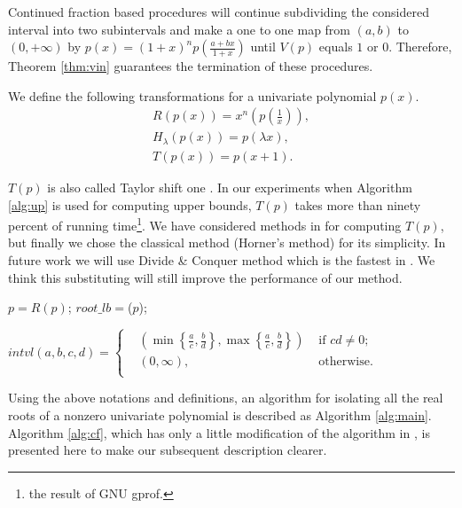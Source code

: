   Continued fraction based procedures will continue subdividing the considered interval into two subintervals and make a one to one map from $(a,b)$ to $(0,+\infty)$ by $  p(x) = (1+x)^{n}p(\frac{a+bx}{1+x})$ until $V(p)$ equals $1$ or $0$. Therefore, Theorem \ref{thm:vin} guarantees the termination of these  procedures.

\begin{definition}  We define the following transformations for a univariate polynomial $p(x)$.
  \begin{eqnarray*}
  R(p(x))=x^n(p(\frac{1}{x})),\\
  H_\lambda(p(x))=p(\lambda x),\\
  T(p(x))=p(x+1).
  \end{eqnarray*}
\end{definition}

$T(p)$  is also called	Taylor shift one \cite{ger04,joh05}. In our experiments when Algorithm \ref{alg:up} is used for computing upper bounds, $T(p)$  takes  more than
ninety percent of running time\footnote{the result of  GNU gprof.}.  We have considered methods in \cite{ger04} for computing $T(p)$, but   finally we chose the  classical
method (Horner's method) for its simplicity. In future work we will use Divide \& Conquer method which is the fastest in \cite{ger04}. We think this substituting
will still improve the performance of our method.

\begin{algorithm}
\caption{\dec}
\DontPrintSemicolon
{}
\end{algorithm}

\begin{algorithm}\label{alg:lb}
\caption{\lb \label{alg:dec}}
\DontPrintSemicolon
{}
$p=R(p)$;\;
$root\_lb=$\up($p$); 
\end{algorithm}


\begin{definition}
$  intvl(a,b,c,d)=  \left\{\begin{aligned}
&  (\min\left\{ \frac{a}{c},\frac{b}{d} \right\},\max\left\{ \frac{a}{c},\frac{b}{d} \right\} ) &\text{ if } cd\neq0;\\
& (0,\infty), &\text{ otherwise}.\\
	\end{aligned}
	\right.
$
\end{definition}


Using the above notations and definitions, an algorithm for isolating all the real roots of a nonzero univariate polynomial is described as Algorithm \ref{alg:main}.
Algorithm \ref{alg:cf}, which has only a little modification of the algorithm in \cite{akr08}, is presented here to make our subsequent description clearer.

